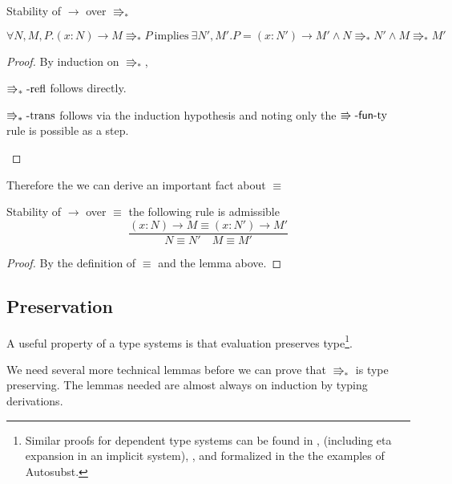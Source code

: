 \begin{lem}
Stability of $\rightarrow$ over $\Rrightarrow_{\ast}$
 
$\forall N,M,P.\left(x:N\right)\rightarrow M\Rrightarrow_{\ast}P\:\mathrm{implies}\:\exists N',M'.P=\left(x:N'\right)\rightarrow M'\land N\Rrightarrow_{\ast}N'\land M\Rrightarrow_{\ast}M'$
\end{lem}
 
\begin{proof}
By induction on $\Rrightarrow_{\ast}$,
\begin{casenv}
 \item $\operatorname{\Rrightarrow_{\ast}-refl}$ follows directly.
 \item $\operatorname{\Rrightarrow_{\ast}-trans}$ follows via the induction hypothesis and noting only the $\operatorname{\Rrightarrow-\mathsf{fun}-ty}$ rule is possible as a step.
\end{casenv}
\end{proof}
Therefore the we can derive an important fact about $\equiv$
\begin{cor}
Stability of $\rightarrow$ over $\equiv$
the following rule is admissible
\[
\frac{\left(x:N\right)\rightarrow M\equiv\left(x:N'\right)\rightarrow M'}{N\equiv N'\quad M\equiv M'}
\]
\end{cor}
 
\begin{proof}
By the definition of $\equiv$ and the lemma above.
\end{proof}
 
\subsection{Preservation}
 
A useful property of a type systems is that evaluation preserves type\footnote{
  Similar proofs for dependent type systems can be found in \cite[Chapter 3]{luo1994computation}, \cite[Section 3.1]{10.1007/3-540-45413-6_27}(including eta expansion in an implicit system), \cite[appendix]{sjoberg2012irrelevance}, and formalized in the the examples of Autosubst\cite{SchaeferEtAl:2015:Autosubst:-Reasoning}.
  }.
 
We need several more technical lemmas before we can prove that $\Rrightarrow_{\ast}$ is type preserving.
The lemmas needed are almost always on induction by typing derivations.
 
